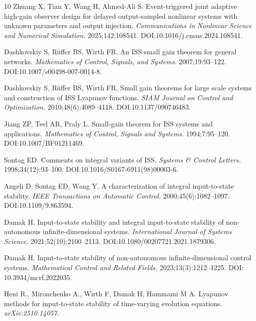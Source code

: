 \documentclass[onecolumn]{autart}
\newenvironment{proof of Prop.ODE}{{\it Proof of Proposition~\ref{Prop.ODE}:\enspace}}{\hfill $\blacksquare$\par}
\newenvironment{proof of PDE}{{\it Proof of Proposition \ref{Prop.8}:\enspace}}{\hfill $\blacksquare$\par}
\begin{document}
{{\begin{thebibliography}{10}
	Zhuang X, Tian Y, Wang H, Ahmed-Ali S. Event-triggered joint adaptive high-gain
	observer design for delayed output-sampled nonlinear systems with unknown
	parameters and output injection. {\it Communications in Nonlinear Science and
		Numerical Simulation.} 2025\string;142\string:108541.
	\newblock DOI:10.1016/j.cnsns.2024.108541.
	
	Dashkovskiy S, R{\"u}ffer BS, Wirth FR. An {ISS} small gain theorem for general
	networks. {\it Mathematics of Control, Signals, and Systems.}
	2007\string;19\string:93--122.
	\newblock DOI:10.1007/s00498-007-0014-8.
	
	Dashkovskiy S, R{\"u}ffer BS, Wirth FR. Small gain theorems for large scale
	systems and construction of {ISS} {L}yapunov functions. {\it SIAM Journal on
		Control and Optimization.} 2010\string;48(6)\string:4089--4118.
	\newblock DOI:10.1137/090746483.
	
	Jiang ZP, Teel AR, Praly L. Small-gain theorem for {ISS} systems and
	applications. {\it Mathematics of Control, Signals and Systems.}
	1994\string;7\string:95--120.
	\newblock DOI:10.1007/BF01211469.
	
	Sontag ED. Comments on integral variants of {ISS}. {\it Systems \& Control
		Letters.} 1998\string;34(12)\string:93--100.
	\newblock DOI:10.1016/S0167-6911(98)00003-6.
	
	Angeli D, Sontag ED, Wang Y. A characterization of integral input-to-state
	stability. {\it IEEE Transactions on Automatic Control.}
	2000\string;45(6)\string:1082--1097.
	\newblock DOI:10.1109/9.863594.
	
	Damak H. Input-to-state stability and integral input-to-state stability of
	non-autonomous infinite-dimensional systems. {\it International Journal of
		Systems Science.} 2021\string;52(10)\string:2100--2113.
	\newblock DOI:10.1080/00207721.2021.1879306.
	
	Damak H. Input-to-state stability of non-autonomous infinite-dimensional
	control systems. {\it Mathematical Control and Related Fields.}
	2023\string;13(3)\string:1212--1225.
	\newblock DOI: 10.3934/mcrf.2022035.
	

	 Heni R.,  Mironchenko A.,  Wirth F,  Damak H,    Hammami  M A. Lyapunov methods for input-to-state stability of time-varying evolution equations. {\it 	arXiv:2510.14057.}
 


\end{thebibliography}}}
\end{document}
